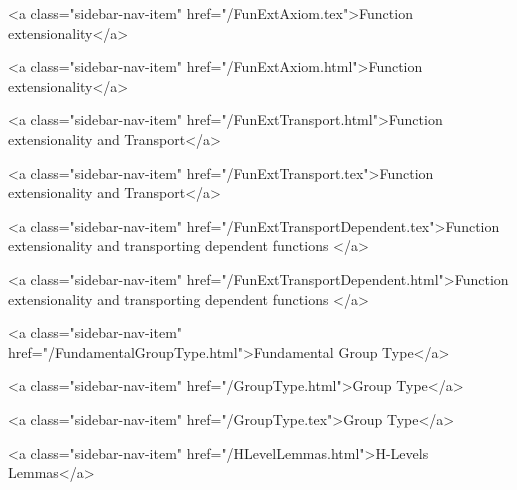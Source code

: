       
    
      
        
          <a class="sidebar-nav-item" href="/FunExtAxiom.tex">Function extensionality</a>
        
      
    
      
        
          <a class="sidebar-nav-item" href="/FunExtAxiom.html">Function extensionality</a>
        
      
    
      
        
          <a class="sidebar-nav-item" href="/FunExtTransport.html">Function extensionality and Transport</a>
        
      
    
      
        
          <a class="sidebar-nav-item" href="/FunExtTransport.tex">Function extensionality and Transport</a>
        
      
    
      
        
          <a class="sidebar-nav-item" href="/FunExtTransportDependent.tex">Function extensionality and transporting dependent functions </a>
        
      
    
      
        
          <a class="sidebar-nav-item" href="/FunExtTransportDependent.html">Function extensionality and transporting dependent functions </a>
        
      
    
      
        
          <a class="sidebar-nav-item" href="/FundamentalGroupType.html">Fundamental Group Type</a>
        
      
    
      
        
          <a class="sidebar-nav-item" href="/GroupType.html">Group Type</a>
        
      
    
      
        
          <a class="sidebar-nav-item" href="/GroupType.tex">Group Type</a>
        
      
    
      
        
          <a class="sidebar-nav-item" href="/HLevelLemmas.html">H-Levels Lemmas</a>
        
      
    
